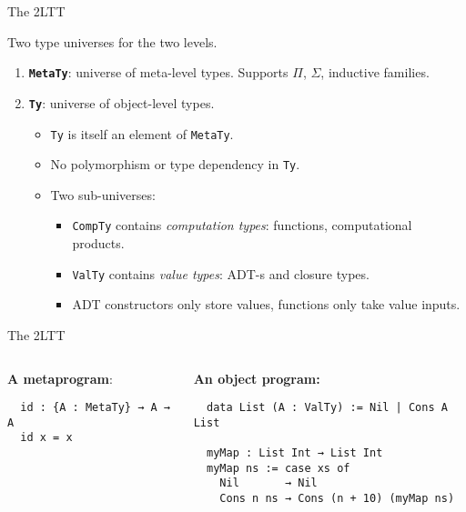 \documentclass[dvipsnames,aspectratio=169]{beamer}
\newcommand{\ttt}[1]{{\texttt{#1}}}
\theoremstyle{remark}
\begin{document}
\begin{frame}[fragile]{The 2LTT}

Two type universes for the two levels.
\vspace{1em}
\begin{enumerate}
\item \textbf{\ttt{MetaTy}}: universe of meta-level types. Supports
      $\Pi$, $\Sigma$, inductive families.
\item \textbf{\ttt{Ty}}: universe of object-level types.
  \begin{itemize}
  \item \ttt{Ty} is itself an element of \ttt{MetaTy}.
  \item No polymorphism or type dependency in \ttt{Ty}.
  \item Two sub-universes:
  \begin{itemize}
  \item \ttt{CompTy} contains \emph{computation types}: functions, computational products.
  \item \ttt{ValTy}  contains \emph{value types}: ADT-s and closure types.
  \item ADT constructors only store values, functions only take value inputs.
  \end{itemize}
  \end{itemize}
\end{enumerate}
\vspace{0.5em}

\end{frame}

\begin{frame}[fragile]{The 2LTT}

\begin{columns}
\begin{column}{0.4\textwidth}
\textbf{A metaprogram}:
\begin{verbatim}
  id : {A : MetaTy} → A → A
  id x = x




\end{verbatim}
\end{column}

\begin{column}{0.6\textwidth}
\textbf{An object program:}
\begin{verbatim}
  data List (A : ValTy) := Nil | Cons A List

  myMap : List Int → List Int
  myMap ns := case xs of
    Nil       → Nil
    Cons n ns → Cons (n + 10) (myMap ns)
\end{verbatim}
\end{column}
\end{columns}


\end{frame}
\end{document}
